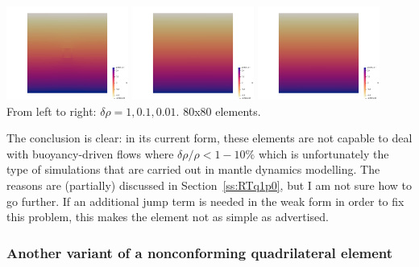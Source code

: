 \begin{center}
\includegraphics[width=4cm]{python_codes/fieldstone_77/results/block/drho/press1}
\includegraphics[width=4cm]{python_codes/fieldstone_77/results/block/drho/press3}
\includegraphics[width=4cm]{python_codes/fieldstone_77/results/block/drho/press2}\\
{\captionfont From left to right: $\delta \rho=1,0.1,0.01$. 80x80 elements.}
\end{center}

The conclusion is clear: in its current form, these elements are not capable to 
deal with buoyancy-driven flows where $\delta \rho/\rho < 1-10\%$ which is 
unfortunately the type of simulations that are carried out in mantle dynamics modelling.
The reasons are (partially) discussed in Section~\ref{ss:RTq1p0}, but 
I am not sure how to go further. If an additional jump term is needed in the 
weak form in order to fix this problem, this makes the element not as simple as
advertised. 


\subsubsection*{Another variant of a nonconforming quadrilateral element}

